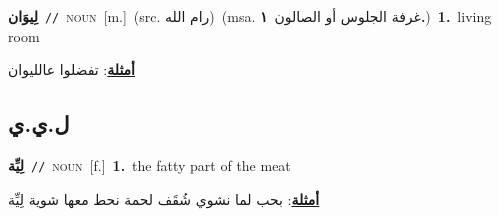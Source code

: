 \documentclass[10pt,a4paper,twoside]{article} %
\begin{document}
\begin{multicols}{2}
{\setlength\topsep{0pt}\textbf{\foreignlanguage{arabic}{لِيوَان}}\ {\color{gray}\texttt{//}\color{black}}\ \textsc{noun}\ [m.]\ (src. \color{gray}\foreignlanguage{arabic}{رام الله}\color{black})\ \color{gray}(msa. \foreignlanguage{arabic}{غرفة الجلوس أو الصالون}~\foreignlanguage{arabic}{\textbf{١.}})\color{black}\ \textbf{1.}~living room\  \begin{flushright}\color{gray}\foreignlanguage{arabic}{\textbf{\underline{\foreignlanguage{arabic}{أمثلة}}}: تفضلوا عالليوان}\end{flushright}\color{black}} \vspace{2mm}

\vspace{-3mm}
\subsection*{\color{blue}\foreignlanguage{arabic}{ل.ي.ي}\color{blue}{}} 

{\setlength\topsep{0pt}\textbf{\foreignlanguage{arabic}{لِيِّة}}\ {\color{gray}\texttt{//}\color{black}}\ \textsc{noun}\ [f.]\ \textbf{1.}~the fatty part of the meat\  \begin{flushright}\color{gray}\foreignlanguage{arabic}{\textbf{\underline{\foreignlanguage{arabic}{أمثلة}}}: بحب لما نشوي شُقَف لحمة نحط معها شوية لِيِّة}\end{flushright}\color{black}} \vspace{2mm}

\end{multicols}
\end{document}
